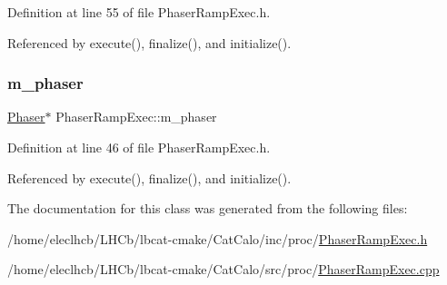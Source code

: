 Definition at line 55 of file Phaser\+Ramp\+Exec.\+h.



Referenced by execute(), finalize(), and initialize().

\mbox{\label{classPhaserRampExec_a3c187e98596d492f195c2743322e263b}} 
\subsubsection{\texorpdfstring{m\+\_\+phaser}{m\_phaser}}
{\footnotesize\ttfamily \hyperlink{classPhaser}{Phaser}$\ast$ Phaser\+Ramp\+Exec\+::m\+\_\+phaser\hspace{0.3cm}{\ttfamily [private]}}



Definition at line 46 of file Phaser\+Ramp\+Exec.\+h.



Referenced by execute(), finalize(), and initialize().



The documentation for this class was generated from the following files\+:\begin{DoxyCompactItemize}
\item 
/home/eleclhcb/\+L\+H\+Cb/lbcat-\/cmake/\+Cat\+Calo/inc/proc/\hyperlink{PhaserRampExec_8h}{Phaser\+Ramp\+Exec.\+h}\item 
/home/eleclhcb/\+L\+H\+Cb/lbcat-\/cmake/\+Cat\+Calo/src/proc/\hyperlink{PhaserRampExec_8cpp}{Phaser\+Ramp\+Exec.\+cpp}\end{DoxyCompactItemize}
